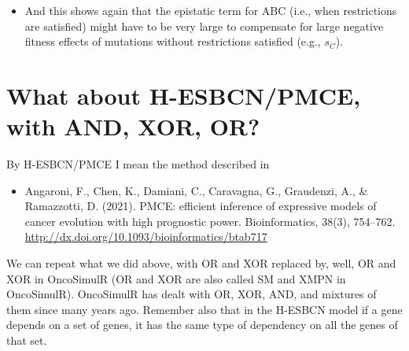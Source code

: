\documentclass[11pt]{article}
\begin{document}
\begin{itemize}
\begin{itemize}
\item And this shows again that the epistatic term for ABC (i.e., when restrictions are satisfied) might have to be very large to compensate for large negative fitness effects of mutations without restrictions satisfied (e.g., \(s_C\)).
\end{itemize}
\end{itemize}





\section{What about H-ESBCN/PMCE, with AND, XOR, OR?}
\label{sec:org1904b6b}

By H-ESBCN/PMCE I mean  the method described in 

\begin{itemize}
\item Angaroni, F., Chen, K., Damiani, C., Caravagna, G., Graudenzi, A., \& Ramazzotti, D. (2021). PMCE: efficient inference of expressive models of cancer evolution with high prognostic power. Bioinformatics, 38(3), 754–762. \url{http://dx.doi.org/10.1093/bioinformatics/btab717}
\end{itemize}

We can repeat what we did above, with OR and XOR replaced by, well, OR and XOR in OncoSimulR (OR and XOR are also called SM and XMPN in OncoSimulR). OncoSimulR has dealt with OR, XOR, AND, and mixtures of them since many years ago. Remember also that in the H-ESBCN model if a gene depends on a set of genes, it has the same type of dependency on all the genes of that set.

\end{document}
